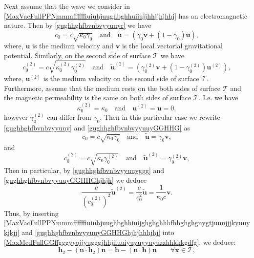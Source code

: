 \documentclass{article}
\theoremstyle{definition}
\theoremstyle{remark}
\renewcommand{\vec}[1]{\mathbf{#1}}
\newcommand{\er}{\eqref}
\newcommand{\er}{\eqref}
\begin{document}
Next assume that the wave we consider in
\er{MaxVacFullPPNmmmffffffiuiuhjuughbghhuiiujjhhjjhjhhj} has an
electromagnetic nature. Then by \er{gughhghfbvnbvyyuuyr} we have
\begin{equation}\label{gughhghfbvnbvyyuuy}
c_0=c\sqrt{\kappa_0\gamma_0}\quad\text{and}\quad\vec {\tilde
u}=\left(\gamma_0\vec v+(1-\gamma_0)\vec u\right),
\end{equation}
where, $\vec u$ is the medium velocity and $\vec v$ is the local
vectorial gravitational potential. Similarly, on the second side of
surface $\mathcal{T}$ we have
\begin{equation}\label{gughhghfbvnbvyyuuyGGHHG}
c^{(2)}_0=c\sqrt{\kappa^{(2)}_0\gamma^{(2)}_0}\quad\text{and}\quad\vec
{\tilde u}^{(2)}=\left(\gamma^{(2)}_0\vec v+(1-\gamma^{(2)}_0)\vec
u^{(2)}\right),
\end{equation}
where, $\vec u^{(2)}$ is the medium velocity on the second side of
surface $\mathcal{T}$. Furthermore, assume that the medium rests on
the both sides of surface $\mathcal{T}$ and the magnetic
permeability is the same on both sides of surface $\mathcal{T}$.
I.e. we have
\begin{equation}\label{gughhghfbvnbvyyuuyll}
\kappa^{(2)}_0=\kappa_0\quad\text{and}\quad\vec u^{(2)}=\vec u=0,
\end{equation}
however $\gamma^{(2)}_0$ can differ from $\gamma_0$. Then in this
particular case we rewrite \er{gughhghfbvnbvyyuuy} and
\er{gughhghfbvnbvyyuuyGGHHG} as
\begin{equation}\label{gughhghfbvnbvyyuuyggg}
c_0=c\sqrt{\kappa_0\gamma_0}\quad\text{and}\quad\vec {\tilde
u}=\gamma_0\vec v,
\end{equation}
and
\begin{equation}\label{gughhghfbvnbvyyuuyGGHHGhjhjh}
c^{(2)}_0=c\sqrt{\kappa_0\gamma^{(2)}_0}\quad\text{and}\quad\vec
{\tilde u}^{(2)}=\gamma^{(2)}_0\vec v,
\end{equation}
Then in particular, by \er{gughhghfbvnbvyyuuyggg} and
\er{gughhghfbvnbvyyuuyGGHHGhjhjh} we deduce
\begin{equation}\label{gughhghfbvnbvyyuuyGGHHGhjhjhhhjhj}
\frac{c}{\left(c^{(2)}_0\right)^2}\vec {\tilde
u}^{(2)}=\frac{c}{c^2_0}\vec {\tilde u}=\frac{1}{\kappa_0 c}\vec v.
\end{equation}
Thus, by inserting
\er{MaxVacFullPPNmmmffffffiuiuhjuughbghhiuijghghghhhfhhghghguygtjuuujjjkyuuykjkjj}
and \er{gughhghfbvnbvyyuuyGGHHGhjhjhhhjhj} into
\er{MaxMedFullGGffgggyyojjyugggjhhjiiuuiyuyuyyuyuzzhhkkkgdfg}, we
deduce:
\begin{equation}\label{MaxMedFullGGffgggyyojjyugggjhhjiiuuiyuyuyyuyuzzhhkkkgdfg1}
\vec h_2-\left(\vec n\cdot \vec h_2\right)\vec n=\vec h-\left(\vec
n\cdot \vec h\right)\vec n\quad\quad\forall\vec x\in\mathcal{T},
\end{equation}
\end{document}
